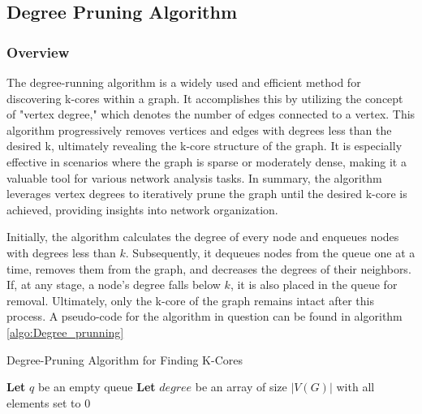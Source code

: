 \label{Algorithms}

\subsection{Degree Pruning Algorithm}

\subsubsection{Overview}

The degree-running algorithm is a widely used and efficient method for discovering k-cores within a graph. It accomplishes this by utilizing the concept of "vertex degree," which denotes the number of edges connected to a vertex. This algorithm progressively removes vertices and edges with degrees less than the desired k, ultimately revealing the k-core structure of the graph. It is especially effective in scenarios where the graph is sparse or moderately dense, making it a valuable tool for various network analysis tasks. In summary, the algorithm leverages vertex degrees to iteratively prune the graph until the desired k-core is achieved, providing insights into network organization.

Initially, the algorithm calculates the degree of every node and enqueues nodes with degrees less than $k$. Subsequently, it dequeues nodes from the queue one at a time, removes them from the graph, and decreases the degrees of their neighbors. If, at any stage, a node's degree falls below $k$, it is also placed in the queue for removal. Ultimately, only the k-core of the graph remains intact after this process. A pseudo-code for the algorithm in question can be found in algorithm \ref{algo:Degree_prunning}

\begin{algorithm}[ht]
  \label{algo:Degree_prunning}
  \caption{Degree-Pruning Algorithm for Finding K-Cores}
  
  \textbf{Let} $q$ be an empty queue\;
  \textbf{Let} $degree$ be an array of size $|V(G)|$ with all elements set to $0$\;
  
  
  
   
\end{algorithm}

